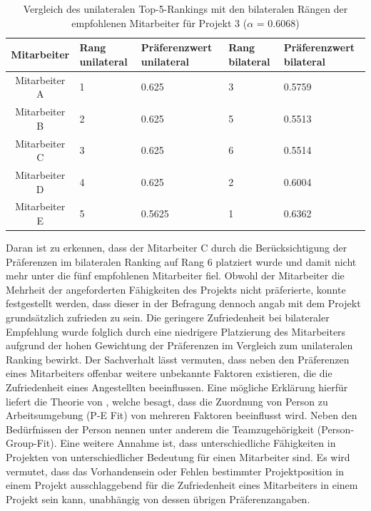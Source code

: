 \begin{table}[htbp]
    \begin{center}
    \begin{tabular}{c|p{0.7in}|p{0.95in}|p{0.7in}|p{0.95in}}
    {\textbf{Mitarbeiter}} & {\textbf{Rang unilateral}} & {\textbf{Präferenzwert unilateral}} & {\textbf{Rang bilateral}} & {\textbf{Präferenzwert bilateral}} \\
    \hline
	Mitarbeiter A & \hfil1 & \hfil0.625 & \hfil3 & \hfil0.5759 \\
    \hline
    Mitarbeiter B & \hfil2 & \hfil0.625 & \hfil5 & \hfil0.5513 \\
    \hline
	Mitarbeiter C & \hfil3 & \hfil0.625 & \hfil6 & \hfil0.5514 \\
    \hline
	Mitarbeiter D & \hfil4 & \hfil0.625 & \hfil2 & \hfil0.6004 \\
    \hline
	Mitarbeiter E & \hfil5 & \hfil0.5625 & \hfil1 & \hfil0.6362 \\
    \end{tabular}
    \end{center}
    \caption[Vergleich des unilateralen Top-5-Rankings mit den bilateralen Rängen der empfohlenen Mitarbeiter für Projekt 3 ($\alpha$ = 0.6068)]{Vergleich des unilateralen Top-5-Rankings mit den bilateralen Rängen der empfohlenen Mitarbeiter für Projekt 3 ($\alpha$ = 0.6068)}
	\label{tab:diskussion:tab1}
\end{table}

Daran ist zu erkennen, dass der Mitarbeiter C durch die Berücksichtigung der Präferenzen im bilateralen Ranking auf Rang 6 platziert wurde und damit nicht mehr unter die fünf empfohlenen Mitarbeiter fiel.
Obwohl der Mitarbeiter die Mehrheit der angeforderten Fähigkeiten des Projekts nicht präferierte, konnte festgestellt werden, dass dieser in der Befragung dennoch angab mit dem Projekt grundsätzlich zufrieden zu sein.
Die geringere Zufriedenheit bei bilateraler Empfehlung wurde folglich durch eine niedrigere Platzierung des Mitarbeiters aufgrund der hohen Gewichtung der Präferenzen im Vergleich zum unilateralen Ranking bewirkt.
Der Sachverhalt lässt vermuten, dass neben den Präferenzen eines Mitarbeiters offenbar weitere unbekannte Faktoren existieren, die die Zufriedenheit eines Angestellten beeinflussen.
Eine mögliche Erklärung hierfür liefert die Theorie von \textcite[S. 1ff.]{malinowski:2006}, welche besagt, dass die Zuordnung von Person zu Arbeitsumgebung (\ac{P-E Fit}) von mehreren Faktoren beeinflusst wird.
Neben den Bedürfnissen der Person nennen \textcite[S. 1ff.]{malinowski:2006} unter anderem die Teamzugehörigkeit (Person-Group-Fit).
Eine weitere Annahme ist, dass unterschiedliche Fähigkeiten in Projekten von unterschiedlicher Bedeutung für einen Mitarbeiter sind.
Es wird vermutet, dass das Vorhandensein oder Fehlen bestimmter Projektposition in einem Projekt ausschlaggebend für die Zufriedenheit eines Mitarbeiters in einem Projekt sein kann, unabhängig von dessen übrigen Präferenzangaben.

